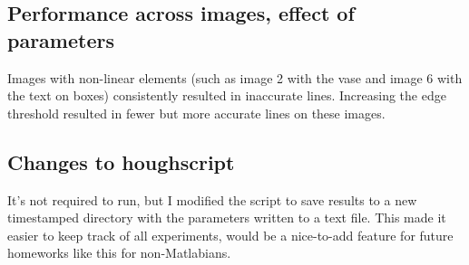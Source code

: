 \documentclass[12pt]{article}
\begin{document}
\newpage
\subsection{Performance across images, effect of parameters}
Images with non-linear elements (such as image 2 with the vase and image 6 with the text on boxes) consistently resulted in inaccurate lines. Increasing the edge threshold resulted in fewer but more accurate lines on these images.

\newpage
\subsection{Changes to houghscript}
It's not required to run, but I modified the script to save results to a new timestamped directory with the parameters written to a text file. This made it easier to keep track of all experiments, would be a nice-to-add feature for future homeworks like this for non-Matlabians.
\end{document}
